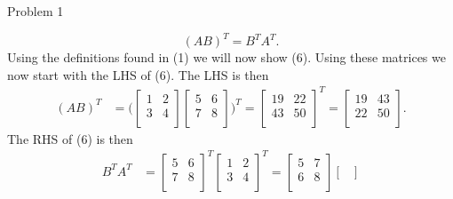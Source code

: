 \begin{problem}{Problem 1}
\begin{Highlight}[Solution]
        \begin{equation}
            (AB)^{T} = B^{T}A^{T}.
        \end{equation}
        Using the definitions found in (1) we will now show (6). Using these matrices we now start with the LHS of (6). The LHS is then
        \begin{align*}
            (AB)^{T} & = 
            \biggl(
                \begin{bmatrix}
                    1 & 2 \\
                    3 & 4 \\
                \end{bmatrix}
                \begin{bmatrix}
                    5 & 6 \\
                    7 & 8 \\
                \end{bmatrix}
            \biggr)^{T}
            = 
            \begin{bmatrix}
                19 & 22 \\
                43 & 50 \\
            \end{bmatrix}^{T}
            = 
            \begin{bmatrix}
                19 & 43 \\
                22 & 50 \\
            \end{bmatrix}.
        \end{align*}
        The RHS of (6) is then
        \begin{align*}
            B^{T}A^{T} & = 
            \begin{bmatrix}
                5 & 6 \\
                7 & 8 \\
            \end{bmatrix}^{T}
            \begin{bmatrix}
                1 & 2 \\
                3 & 4 \\
            \end{bmatrix}^{T}
            = 
            \begin{bmatrix}
                5 & 7 \\
                6 & 8 \\
            \end{bmatrix}
            \begin{bmatrix}

\end{bmatrix}
\end{align*}
\end{Highlight}
\end{problem}

